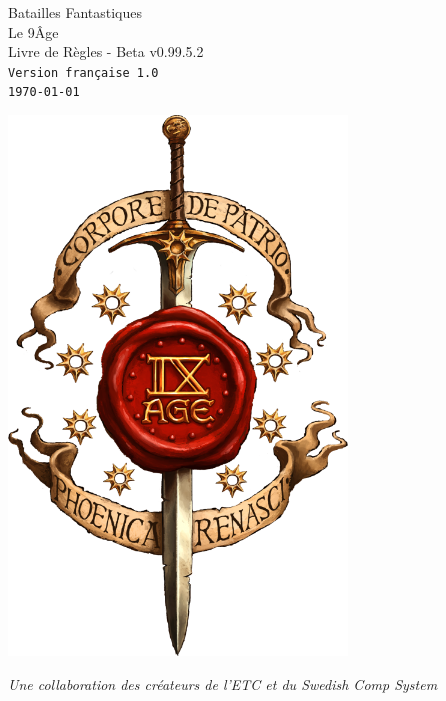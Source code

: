 
\begin{titlepage}
\begin{center}


{\fontsize{50}{60}\selectfont Batailles Fantastiques \\ Le 9\ieme Âge} \\
\vspace{0.7cm}
{\fontsize{20}{24}\selectfont Livre de Règles - Beta v0.99.5.2} \\
\vspace{0.4cm}
{\fontsize{14}{16.8}\selectfont \texttt{Version française 1.0}} \\
{\fontsize{14}{16.8}\selectfont \texttt{\today}} \\

\vfill

\includegraphics[width=9cm]{logo_9th.png}

\vfill

{\fontsize{12}{14.4}\selectfont \textit{Une collaboration des créateurs de l'ETC et du Swedish Comp System}} \\


\end{center}


\end{titlepage}
